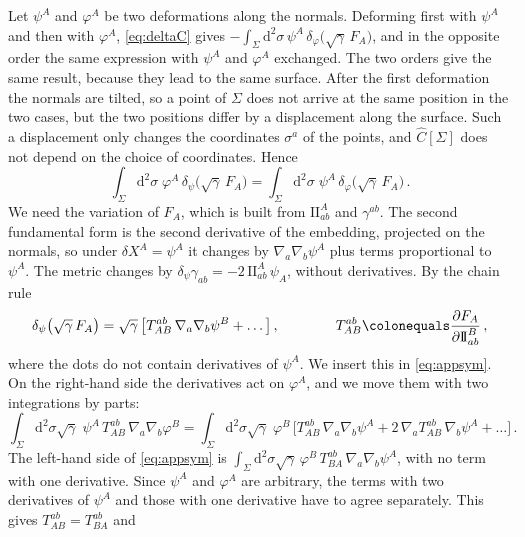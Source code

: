 \documentclass[a4paper,11pt]{article}
\newcommand{\II}{\mathrm{I\!I}}
\newcommand{\dd}{\mathrm{d}}
\begin{document}
Let $\psi^A$ and $\varphi^A$ be two deformations along the normals. Deforming first with $\psi^A$ and then with $\varphi^A$, \eqref{eq:deltaC} gives $-\int_\Sigma\dd^2\sigma\,\psi^A\,\delta_\varphi\bigl(\sqrt\gamma\,F_A\bigr)$, and in the opposite order the same expression with $\psi^A$ and $\varphi^A$ exchanged. The two orders give the same result, because they lead to the same surface. After the first deformation the normals are tilted, so a point of $\Sigma$ does not arrive at the same position in the two cases, but the two positions differ by a displacement along the surface. Such a displacement only changes the coordinates $\sigma^a$ of the points, and $\widehat C[\Sigma]$ does not depend on the choice of coordinates. Hence
\begin{equation}\label{eq:appsym}
	\int_\Sigma\dd^2\sigma\;\varphi^A\,\delta_\psi\bigl(\sqrt\gamma\,F_A\bigr)=\int_\Sigma\dd^2\sigma\;\psi^A\,\delta_\varphi\bigl(\sqrt\gamma\,F_A\bigr)\, .
\end{equation}
We need the variation of $F_A$, which is built from $\II^A_{ab}$ and $\gamma^{ab}$. The second fundamental form is the second derivative of the embedding, projected on the normals, so under $\delta X^A=\psi^A$ it changes by $\nabla_a\nabla_b\psi^A$ plus terms proportional to $\psi^A$. The metric changes by $\delta_\psi\gamma_{ab}=-2\,\II^A_{ab}\,\psi_A$, without derivatives. By the chain rule
\begin{equation}
	\delta_\psi\bigl(\sqrt\gamma\,F_A\bigr)=\sqrt\gamma\,\bigl[T_{AB}^{ab}\,\nabla_a\nabla_b\psi^B+\dots\bigr]\, ,\qquad\qquad T_{AB}^{ab}\colonequals\frac{\partial F_A}{\partial\II^B_{ab}}\, ,
\end{equation}
where the dots do not contain derivatives of $\psi^A$. We insert this in \eqref{eq:appsym}. On the right-hand side the derivatives act on $\varphi^A$, and we move them with two integrations by parts:
\begin{equation}
	\int_\Sigma\dd^2\sigma\sqrt\gamma\;\psi^A\,T_{AB}^{ab}\,\nabla_a\nabla_b\varphi^B
	=\int_\Sigma\dd^2\sigma\sqrt\gamma\;\varphi^B\,\bigl[T_{AB}^{ab}\,\nabla_a\nabla_b\psi^A+2\,\nabla_aT_{AB}^{ab}\,\nabla_b\psi^A+\dots\bigr]\, .
\end{equation}
The left-hand side of \eqref{eq:appsym} is $\int_\Sigma\dd^2\sigma\sqrt\gamma\,\varphi^B\,T_{BA}^{ab}\,\nabla_a\nabla_b\psi^A$, with no term with one derivative. Since $\psi^A$ and $\varphi^A$ are arbitrary, the terms with two derivatives of $\psi^A$ and those with one derivative have to agree separately. This gives $T_{AB}^{ab}=T_{BA}^{ab}$ and
\end{document}
